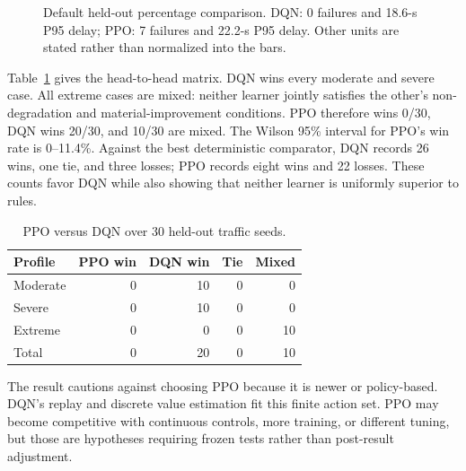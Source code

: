 \documentclass[conference]{IEEEtran}
\begin{document}
\begin{figure}[t]
\centering
{}
\caption{Default held-out percentage comparison. DQN: 0 failures and 18.6-s P95 delay; PPO: 7 failures and 22.2-s P95 delay. Other units are stated rather than normalized into the bars.}
\label{fig:comparison}
\end{figure}

Table~\ref{tab:matrix} gives the head-to-head matrix. DQN wins every moderate and severe case. All extreme cases are mixed: neither learner jointly satisfies the other's non-degradation and material-improvement conditions. PPO therefore wins 0/30, DQN wins 20/30, and 10/30 are mixed. The Wilson 95\% interval for PPO's win rate is 0--11.4\%. Against the best deterministic comparator, DQN records 26 wins, one tie, and three losses; PPO records eight wins and 22 losses. These counts favor DQN while also showing that neither learner is uniformly superior to rules.

\begin{table}[t]
\caption{PPO versus DQN over 30 held-out traffic seeds.}
\label{tab:matrix}
\centering\small
\begin{tabular}{lrrrr}
\toprule
Profile & PPO win & DQN win & Tie & Mixed\\
\midrule
Moderate & 0 & 10 & 0 & 0\\
Severe & 0 & 10 & 0 & 0\\
Extreme & 0 & 0 & 0 & 10\\
\midrule
Total & 0 & 20 & 0 & 10\\
\bottomrule
\end{tabular}
\end{table}

The result cautions against choosing PPO because it is newer or policy-based. DQN's replay and discrete value estimation fit this finite action set. PPO may become competitive with continuous controls, more training, or different tuning, but those are hypotheses requiring frozen tests rather than post-result adjustment.
\end{document}
